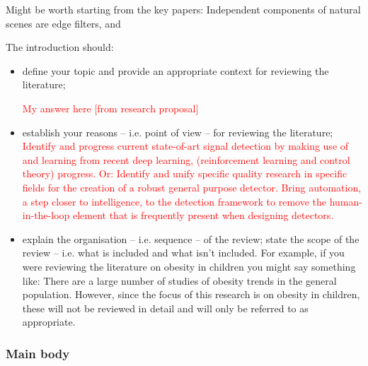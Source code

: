 \documentclass[12pt]{llncs}
\begin{document}
Might be worth starting from the key papers: Independent components of natural scenes are edge filters, and 


The introduction should:
\begin{itemize}
	\item {define your topic and provide an appropriate context for reviewing the literature;}
	
	\textcolor{red}{My answer here [from research proposal]}
	\item establish your reasons – i.e. point of view – for
	reviewing the literature;
	\textcolor{red}{Identify and progress current state-of-art signal detection by making use of and learning from recent deep learning, (reinforcement learning and control theory) progress. Or: Identify and unify specific quality research in specific fields for the creation of a robust general purpose detector. Bring automation, a step closer to intelligence, to the detection framework to remove the human-in-the-loop element that is frequently present when designing detectors.}
	\item explain the organisation – i.e. sequence – of the review;
	state the scope of the review – i.e. what is included and what isn’t included. For example, if you were reviewing the literature on obesity in children you might say something like: There are a large number of studies of obesity trends in the general population. However, since the focus of this research is on obesity in children, these will not be reviewed in detail and will only be referred to as appropriate.
\end{itemize}



\subsubsection*{Main body}
\end{document}
